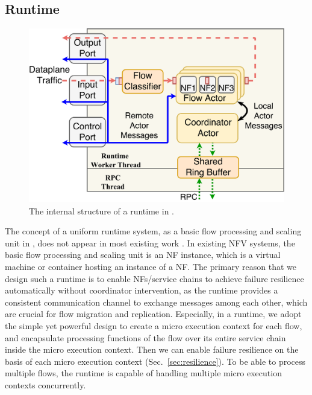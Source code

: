 
\subsection{Runtime}
\label{sec:runtime}

\begin{figure}
		\centering
		\includegraphics[width=\columnwidth]{figure/new-nfactor-runtime-arch.pdf}

		\caption{The internal structure of a runtime in \nfactor.}
\label{fig:runtime-arch}
\end{figure}

The concept of a uniform runtime system, as a basic flow processing and scaling unit in \nfactor, does not appear in most existing work \cite{bremler2015openbox, gember2012stratos, palkar2015e2}. In existing NFV systems, the basic flow processing and scaling unit is an NF instance, which is a virtual machine or container hosting an instance of a NF. %
 The primary reason that we design such a runtime is to enable NFs/service chains to achieve failure resilience automatically without coordinator intervention, as the runtime provides a consistent communication channel
 to exchange messages among each other, which are crucial for flow migration and replication.
  Especially, in a runtime, we adopt the simple yet powerful design to create a micro execution context for each flow, and encapsulate processing functions of the flow over its entire service chain inside the micro execution context. Then we can enable failure resilience on the basis of each micro execution context (Sec.~\ref{sec:resilience}). To be able to process multiple flows, the runtime is capable of handling multiple micro execution contexts concurrently.


